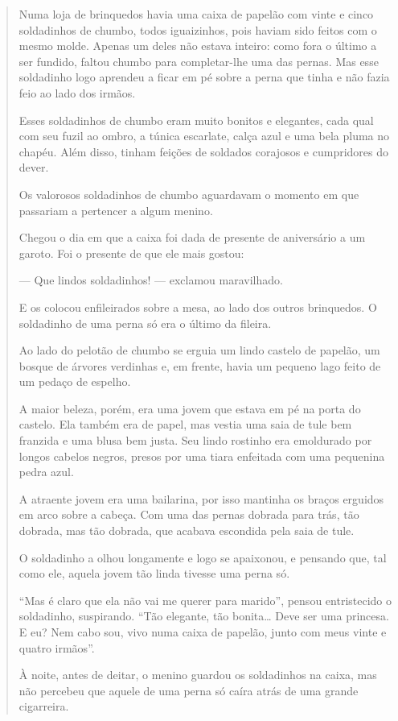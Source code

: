 \begin{escolha}
\begin{escolha}
\begin{escolha}
\begin{quote}
Numa loja de brinquedos havia uma caixa de papelão com vinte e cinco
soldadinhos de chumbo, todos iguaizinhos, pois haviam sido feitos com o
mesmo molde. Apenas um deles não estava inteiro: como fora o último a ser
fundido, faltou chumbo para completar-lhe uma das pernas. Mas esse soldadinho
logo aprendeu a ficar em pé sobre a perna que tinha e não fazia feio
ao lado dos irmãos.

Esses soldadinhos de chumbo eram muito bonitos e elegantes, cada qual
com seu fuzil ao ombro, a túnica escarlate, calça azul e uma bela pluma
no chapéu. Além disso, tinham feições de soldados corajosos e
cumpridores do dever.

Os valorosos soldadinhos de chumbo aguardavam o momento em que passariam
a pertencer a algum menino.

Chegou o dia em que a caixa foi dada de presente de aniversário a um
garoto. Foi o presente de que ele mais gostou:

--- Que lindos soldadinhos! --- exclamou maravilhado.

E os colocou enfileirados sobre a mesa, ao lado dos outros brinquedos. O
soldadinho de uma perna só era o último da fileira.

Ao lado do pelotão de chumbo se erguia um lindo castelo de papelão, um
bosque de árvores verdinhas e, em frente, havia um pequeno lago feito de
um pedaço de espelho.

A maior beleza, porém, era uma jovem que estava em pé na porta do
castelo. Ela também era de papel, mas vestia uma saia de tule bem
franzida e uma blusa bem justa. Seu lindo rostinho era emoldurado por
longos cabelos negros, presos por uma tiara enfeitada com uma pequenina
pedra azul.

A atraente jovem era uma bailarina, por isso mantinha os braços erguidos
em arco sobre a cabeça. Com uma das pernas dobrada para trás, tão
dobrada, mas tão dobrada, que acabava escondida pela saia de tule.

O soldadinho a olhou longamente e logo se apaixonou, e pensando que, tal
como ele, aquela jovem tão linda tivesse uma perna só.

``Mas é claro que ela não vai me querer para marido'', pensou
entristecido o soldadinho, suspirando. ``Tão elegante, tão
bonita\ldots{} Deve ser uma princesa. E eu? Nem cabo sou, vivo numa
caixa de papelão, junto com meus vinte e quatro
irmãos''.

À noite, antes de deitar, o menino guardou os soldadinhos na caixa, mas
não percebeu que aquele de uma perna só caíra atrás de uma grande
cigarreira.


\end{quote}
\end{escolha}
\end{escolha}
\end{escolha}
